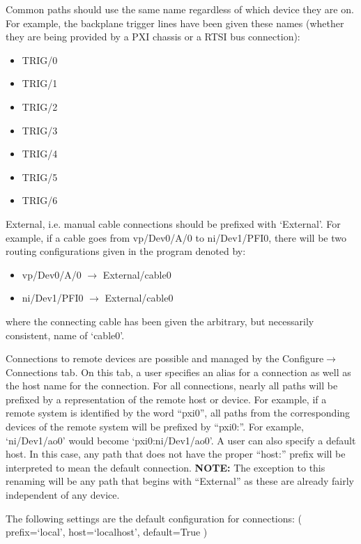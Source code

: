Common paths should use the same name regardless of which device they are on.
For example, the backplane trigger lines have been given these names (whether
they are being provided by a PXI chassis or a RTSI bus connection):
\begin{itemize}
  \item TRIG/0
  \item TRIG/1
  \item TRIG/2
  \item TRIG/3
  \item TRIG/4
  \item TRIG/5
  \item TRIG/6
\end{itemize}

External, i.e. manual cable connections should be prefixed with `External'.  For
example, if a cable goes from vp/Dev0/A/0 to ni/Dev1/PFI0, there will be two
routing configurations given in the program denoted by:
\begin{itemize}
  \item vp/Dev0/A/0  $\rightarrow$  External/cable0
  \item ni/Dev1/PFI0 $\rightarrow$  External/cable0
\end{itemize}
where the connecting cable has been given the arbitrary, but necessarily
consistent, name of `cable0'.


Connections to remote devices are possible and managed by the
Configure$\rightarrow$Connections tab.  On this tab, a user specifies an alias for a
connection as well as the host name for the connection.
For all connections, nearly all paths will be prefixed by a
representation of the remote host or device.  For example, if a remote system is
identified by the word ``pxi0'', all paths from the corresponding devices of the
remote system will be prefixed by ``pxi0:''.  For example, `ni/Dev1/ao0' would become
`pxi0:ni/Dev1/ao0'.  A user can also specify a default host.  In this case, any
path that does not have the proper ``host:'' prefix will be interpreted to mean
the default connection.
\textbf{NOTE:} The exception to this renaming will be any path that begins with ``External'' as
these are already fairly independent of any device.

The following settings are the default configuration
for connections:
( prefix=`local', host=`localhost', default=True )



